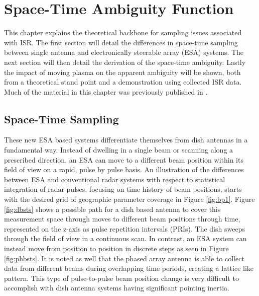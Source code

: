 \chapter{Space-Time Ambiguity Function}
\label{chapter:stamb}
\thispagestyle{myheadings}

\graphicspath{{3_STAmb/Figures/}}

This chapter explains the theoretical backbone for sampling issues associated with ISR. The first section will detail the differences in space-time sampling between single antenna and electronically steerable array (ESA) systems. The next section will then detail the derivation of the space-time ambiguity. Lastly the impact of moving plasma on the apparent ambiguity will be shown, both from a theoretical stand point and a demonstration using collected ISR data. Much of the material in this chapter was previously published in \cite{RDS:RDS20236}.


\section{Space-Time Sampling}
\label{sec:sptimesamp}
These new ESA based systems differentiate themselves from dish antennas in a fundamental way. Instead of dwelling in a single beam or scanning along a prescribed direction, an ESA can move to a different beam position within its field of view on a rapid, pulse by pulse basis. An illustration of the differences between ESA and conventional radar systems with respect to statistical integration of radar pulses, focusing on time history of beam positions, starts with the desired grid of geographic parameter coverage in Figure \ref{fig:bp1}. Figure \ref{fig:dbsts} shows a possible path for a dish based antenna to cover this measurement space through moves to different beam positions through time, represented on the z-axis as pulse repetition intervals (PRIs). The dish sweeps through the field of view in a continuous scan.  In contrast, an ESA system can instead move from position to position in discrete steps as seen in Figure \ref{fig:phbsts}. It is noted as well that the phased array antenna is able to collect data from different beams during overlapping time periods, creating a lattice like pattern. This type of pulse-to-pulse beam position change is very difficult to accomplish with dish antenna systems having significant pointing inertia. 

